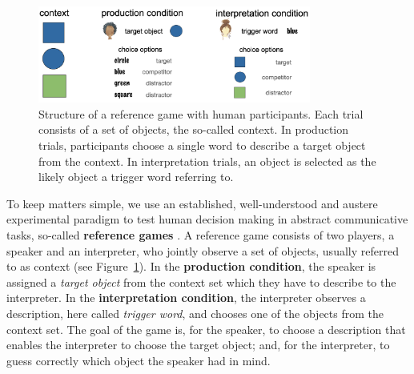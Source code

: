 \documentclass[fleqn]{article}
\begin{document}
\begin{figure}
  \centering

  \includegraphics[width = 0.8\textwidth]{00-pics/reference-game.png}

  \caption{Structure of a reference game with human participants. Each trial consists of a set of objects, the so-called context. In production trials, participants choose a single word to describe a target object from the context. In interpretation trials, an object is selected as the likely object a trigger word referring to.}
  \label{fig:ref-game}
\end{figure}

To keep matters simple, we use an established, well-understood and austere experimental paradigm to test human decision making in abstract communicative tasks, so-called \textbf{reference games} \citep[e.g.,][]{FrankGoodman2012:Predicting-Prag,DegenFranke2013:Cost-Based-Prag,QingFranke2013:Variations-on-a,Frank2016:Rational-speech,SikosVenhuizen2021:Reevaluating-pr}.
A reference game consists of two players, a speaker and an interpreter, who jointly observe a set of objects, usually referred to as context (see Figure~\ref{fig:ref-game}).
In the \textbf{production condition}, the speaker is assigned a \emph{target object} from the context set which they have to describe to the interpreter.
In the \textbf{interpretation condition}, the interpreter observes a description, here called \emph{trigger word}, and chooses one of the objects from the context set.
The goal of the game is, for the speaker, to choose a description that enables the interpreter to choose the target object; and, for the interpreter, to guess correctly which object the speaker had in mind.
\end{document}
